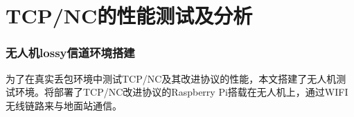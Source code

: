 \chapter{TCP/NC的性能测试及分析}
\subsection{无人机lossy信道环境搭建}
为了在真实丢包环境中测试TCP/NC及其改进协议的性能，本文搭建了无人机测试环境。将部署了TCP/NC改进协议的Raspberry Pi搭载在无人机上，通过WIFI无线链路来与地面站通信。